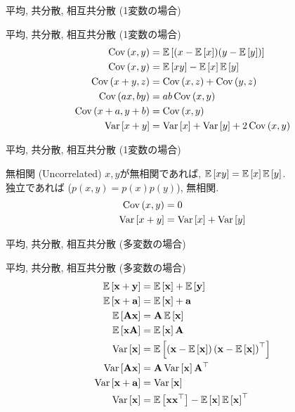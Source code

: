 \documentclass[dvipdfmx,notheorems,t]{beamer}
\begin{document}
\begin{frame}{平均, 共分散, 相互共分散 (1変数の場合)}
\begin{block}{平均, 共分散, 相互共分散 (1変数の場合)}
  \begin{align*}
    \Cov{x}{y} &= \E{(x - \E{x}) (y - \E{y})} \\
    \Cov{x}{y} &= \E{xy} - \E{x} \E{y} \\
    \Cov{x + y}{z} &= \Cov{x}{z} + \Cov{y}{z} \\
    \Cov{ax}{by} &= ab \Cov{x}{y} \\
    \Cov{x + a}{y + b} &= \Cov{x}{y} \\
    \Var{x + y} &= \Var{x} + \Var{y} + 2 \Cov{x}{y}
  \end{align*}
\end{block}
\end{frame}

\begin{frame}{平均, 共分散, 相互共分散 (1変数の場合)}
\begin{block}{無相関 (Uncorrelated)}
  $x, y$が無相関であれば, $\E{xy} = \E{x} \E{y}$. \\
  独立であれば ($p(x, y) = p(x) p(y)$), 無相関.
  \begin{align*}
    \Cov{x}{y} &= 0 \\
    \Var{x + y} &= \Var{x} + \Var{y}
  \end{align*}
\end{block}
\end{frame}

\begin{frame}{平均, 共分散, 相互共分散 (多変数の場合)}
\begin{block}{平均, 共分散, 相互共分散 (多変数の場合)}
  \begin{align*}
    \E{\vb{x} + \vb{y}} &= \E{\vb{x}} + \E{\vb{y}} \\
    \E{\vb{x} + \vb{a}} &= \E{\vb{x}} + \vb{a} \\
    \E{\vb{A} \vb{x}} &= \vb{A} \E{\vb{x}} \\
    \E{\vb{x} \vb{A}} &= \E{\vb{x}} \vb{A} \\
    \Var{\vb{x}} &= \E{\left( \vb{x} - \E{\vb{x}} \right) \left( \vb{x} - \E{\vb{x}} \right)^\top} \\
    \Var{\vb{A} \vb{x}} &= \vb{A} \Var{\vb{x}} \vb{A}^\top \\
    \Var{\vb{x} + \vb{a}} &= \Var{\vb{x}} \\
    \Var{\vb{x}} &= \E{\vb{x} \vb{x}^\top} - \E{\vb{x}} \E{\vb{x}}^\top
  \end{align*}
\end{block}
\end{frame}
\end{document}
